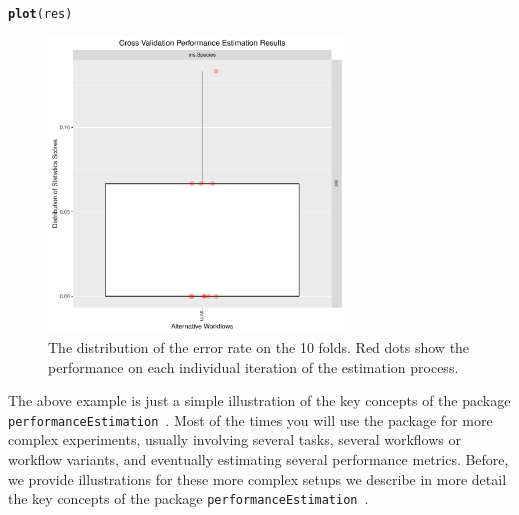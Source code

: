 \documentclass[10pt,a4paper]{article}\usepackage[]{graphicx}\usepackage[]{color}
\makeatletter
\newcommand{\hlstd}[1]{\textcolor[rgb]{0.345,0.345,0.345}{#1}}%
\newcommand{\hlkwd}[1]{\textcolor[rgb]{0.737,0.353,0.396}{\textbf{#1}}}%
\newenvironment{kframe}{%
 \def\at@end@of@kframe{}%
 \ifinner\ifhmode%
  \def\at@end@of@kframe{\end{minipage}}%
  \begin{minipage}{\columnwidth}%
 \fi\fi%
 \def\FrameCommand##1{\hskip\@totalleftmargin \hskip-\fboxsep
 \colorbox{shadecolor}{##1}\hskip-\fboxsep
     \hskip-\linewidth \hskip-\@totalleftmargin \hskip\columnwidth}%
 \MakeFramed {\advance\hsize-\width
   \@totalleftmargin\z@ \linewidth\hsize
   \@setminipage}}%
 {\par\unskip\endMakeFramed%
 \at@end@of@kframe}
\newenvironment{knitrout}{}{} %
\newcommand{\PE}{package \texttt{performanceEstimation}\ }
\makeatother
\begin{document}
\begin{knitrout}\footnotesize
{}\color{fgcolor}\begin{kframe}
\begin{alltt}
\hlkwd{plot}\hlstd{(res)}
\end{alltt}
\end{kframe}\begin{figure}

{\centering \includegraphics[width=0.7\textwidth]{figures/perfEst-ex1Iris-1} 

}

\caption[The distribution of the error rate on the 10 folds]{The distribution of the error rate on the 10 folds. Red dots show the performance on each individual iteration of the estimation process.}\label{fig:ex1Iris}
\end{figure}


\end{knitrout}



The above  example is just a simple illustration of the key concepts of the \PE. Most of the times you will use the package for more complex experiments, usually involving several tasks, several workflows or workflow variants, and eventually estimating several performance metrics. Before, we provide illustrations for these more complex setups we describe in more detail the key concepts of the \PE.
\end{document}

